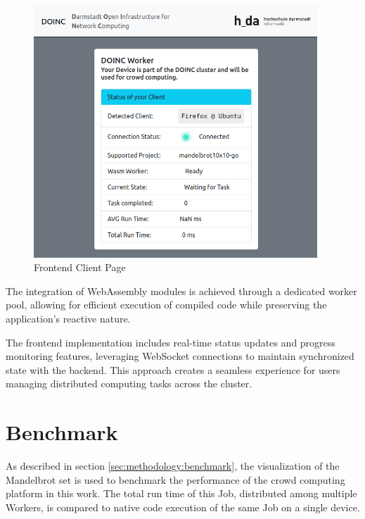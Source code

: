 \begin{figure}[htbp]
    \centering
    \includegraphics[width=0.95\textwidth]{gfx/figures/client-page.png}
    \caption{Frontend Client Page}
    \label{fig:implementation:client-page}
\end{figure}

The integration of WebAssembly modules is achieved through a dedicated worker pool, allowing for efficient execution of compiled code while preserving the application's reactive nature. 

The frontend implementation includes real-time status updates and progress monitoring features, leveraging WebSocket connections to maintain synchronized state with the backend. This approach creates a seamless experience for users managing distributed computing tasks across the cluster.

\section{Benchmark}
\label{sec:implementation:benchmark}
As described in section \ref{sec:methodology:benchmark}, the visualization of the Mandelbrot set is used to benchmark the performance of the crowd computing platform in this work. The total run time of this Job, distributed among multiple Workers, is compared to native code execution of the same Job on a single device.

